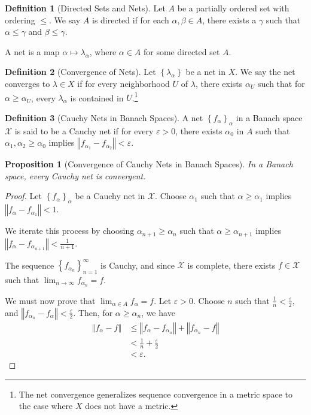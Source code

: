 \documentclass[10pt]{extarticle}
\newcommand{\norm}[1]{\left\Vert #1\right\Vert}
\newcommand{\set}[1]{\left\{#1\right\}}
\newcommand{\ve}{\varepsilon}
\theoremstyle{plain}
\newtheorem*{proposition}{Proposition}
\theoremstyle{definition}
\newtheorem*{definition}{Definition}
\theoremstyle{note}
\renewcommand{\newline}{\hfill\break}
\begin{document}
\begin{definition}[Directed Sets and Nets]
  Let $A$ be a partially ordered set with ordering $\leq$. We say $A$ is directed if for each $\alpha,\beta \in A$, there exists a $\gamma$ such that $\alpha \leq \gamma$ and $\beta \leq \gamma$.\newline

  A net is a map $\alpha \mapsto \lambda_{\alpha}$, where $\alpha\in A$ for some directed set $A$. 
\end{definition}
\begin{definition}[Convergence of Nets]
  Let $\set{\lambda_{\alpha}}$ be a net in $X$. We say the net converges to $\lambda \in X$ if for every neighborhood $U$ of $\lambda$, there exists $\alpha_{U}$ such that for $\alpha \geq \alpha_U$, every $\lambda_{\alpha}$ is contained in $U$.\footnote{The net convergence generalizes sequence convergence in a metric space to the case where $X$ does not have a metric.}
\end{definition}
\begin{definition}[Cauchy Nets in Banach Spaces]
  A net $\set{f_{\alpha}}_{\alpha}$ in a Banach space $\mathcal{X}$ is said to be a Cauchy net if for every $\ve > 0$, there exists $\alpha_0$ in $A$ such that $\alpha_1,\alpha_2 \geq \alpha_0$ implies $\norm{f_{\alpha_1} -f_{\alpha_2}} < \ve$.
\end{definition}
\begin{proposition}[Convergence of Cauchy Nets in Banach Spaces]
In a Banach space, every Cauchy net is convergent.
\end{proposition}
\begin{proof}
  Let $\set{f_{\alpha}}_{\alpha}$ be a Cauchy net in $\mathcal{X}$. Choose $\alpha_1$ such that $\alpha \geq \alpha_1$ implies $\norm{f_{\alpha} - f_{\alpha_1}} < 1$.\newline

  We iterate this process by choosing $\alpha_{n+1}\geq \alpha_n$ such that $\alpha \geq \alpha_{n+1}$ implies  $\norm{f_{\alpha} - f_{\alpha_{n+1}}} < \frac{1}{n+1}$.\newline

  The sequence $\set{f_{\alpha_n}}_{n=1}^{\infty}$ is Cauchy, and since $\mathcal{X}$ is complete, there exists $f\in \mathcal{X}$ such that $\lim_{n\rightarrow\infty} f_{\alpha_n} = f$.\newline

  We must now prove that $\lim_{\alpha\in A}f_{\alpha} = f$. Let $\ve > 0$. Choose $n$ such that $\frac{1}{n} < \frac{\ve}{2}$, and $\norm{f_{\alpha_n} - f_{\alpha}} < \frac{\ve}{2}$. Then, for $\alpha \geq \alpha_n$, we have
  \begin{align*}
    \norm{f_{\alpha} - f} &\leq \norm{f_{\alpha} - f_{\alpha_n}} + \norm{f_{\alpha_n} - f}\\
                          &< \frac{1}{n} + \frac{\ve}{2}\\
                          &< \ve.
  \end{align*}
\end{proof}
\end{document}
